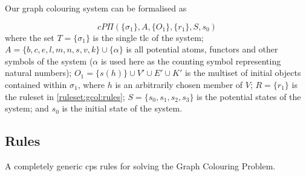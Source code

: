 Our graph colouring system can be formalised as

\[
cP\Pi(\{\sigma_1\}, A, \{O_1\}, \{r_1\}, S, s_0)
\] where the set \(T = \{\sigma_1\}\) is the single \gls{tlc} of the system; \(A = \{b, c, e,\allowbreak l,\allowbreak m,\allowbreak n, s, v, k\} \allowbreak \cup \{\alpha\}\) is all potential atoms, functors and other symbols of the system (\(\alpha\) is used here as the counting symbol representing natural numbers); \(O_1 = \{s(h)\} \cup V' \allowbreak \cup E' \allowbreak \cup K'\) is the multiset of initial objects contained within \(\sigma_1\), where \(h\) is an arbitrarily chosen member of \(V\); \(R = \{r_1\}\) is the ruleset in \cref{ruleset:gcol:rules}; \(S = \{s_0, s_1, s_2, s_3\}\) is the potential states of the system; and \(s_0\) is the initial state of the system.



\subsection{\label{sec:gcol:rules}Rules}

\begin{cprulesetfloat}
\begin{cpruleset}

    
    
    
    
    

\end{cpruleset}
\caption[\gls{cps} rules for the Graph Colouring Problem]{\label{ruleset:gcol:rules}A completely generic \gls{cps} rules for solving the Graph Colouring Problem.}
\end{cprulesetfloat}

